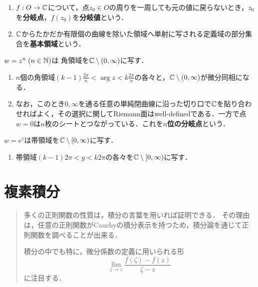 \documentclass[uplatex, dvipdfmx]{jsreport}
\begin{document}
\begin{definition}\mbox{}
    \begin{enumerate}
        \item $f:O\to\mathbb{C}$について，点$z_0\in O$の周りを一周しても元の値に戻らないとき，$z_0$を\textbf{分岐点}，$f(z_0)$を\textbf{分岐値}という．
        \item $\mathbb{C}$からたかだか有限個の曲線を除いた領域へ単射に写される定義域の部分集合を\textbf{基本領域}という．
    \end{enumerate}
\end{definition}

\begin{example}[多項式]
    $w=z^n\;(n\in\mathbb{N})$は
    角領域を$\mathbb{C}\setminus(0,\infty)$に写す．
    \begin{enumerate}
        \item $n$個の角領域$(k-1)\frac{2\pi}{n}<\arg z<k\frac{2\pi}{n}$の各々と，$\mathbb{C}\setminus(0,\infty)$が微分同相になる．
        \item なお，このとき$0,\infty$を通る任意の単純閉曲線に沿った切り口で$\mathbb{C}$を貼り合わせればよく，その選択に関してRiemann面はwell-definedである．一方で点$w=0$は$n$枚のシートとつながっている．これを\textbf{$n$位の分岐点}という．
    \end{enumerate}
\end{example}

\begin{example}[指数関数]
    $w=e^z$は帯領域を$\mathbb{C}\setminus[0,\infty)$に写す．
    \begin{enumerate}
        \item 帯領域$(k-1)2\pi<y<k2\pi$の各々を$\mathbb{C}\setminus[0,\infty)$に写す．
    \end{enumerate}
\end{example}


\chapter{複素積分}

\begin{quotation}
    多くの正則関数の性質は，積分の言葉を用いれば証明できる．
    その理由は，任意の正則関数がCauchyの積分表示を持つため，積分論を通じて正則関数を調べることが出来る．

    積分の中でも特に，微分係数の定義に用いられる形
    \[\lim_{\zeta\to z}\frac{f(\zeta)-f(z)}{\zeta-z}\]
    に注目する．
\end{quotation}
\end{document}
